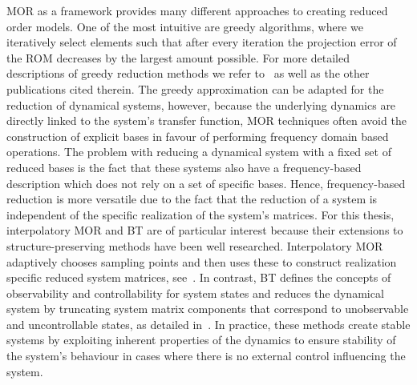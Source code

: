 \ac{MOR} as a framework provides many different approaches to creating reduced order models.
One of the most intuitive are greedy algorithms, where we iteratively select elements such that after every iteration the projection error of the \ac{ROM} decreases by the largest amount possible.
For more detailed descriptions of greedy reduction methods we refer to~\cite{Grepl2005, Rozza2008, Buffa2012} as well as the other publications cited therein.
The greedy approximation can be adapted for the reduction of dynamical systems, however, because the underlying dynamics are directly linked to the system's transfer function, \ac{MOR} techniques often avoid the construction of explicit bases in favour of performing frequency domain based operations.
The problem with reducing a dynamical system with a fixed set of reduced bases is the fact that these systems also have a frequency-based description which does not rely on a set of specific bases.
Hence, frequency-based reduction is more versatile due to the fact that the reduction of a system is independent of the specific realization of the system's matrices.
For this thesis, interpolatory \ac{MOR} and \ac{BT} are of particular interest because their extensions to structure-preserving methods have been well researched.
Interpolatory \ac{MOR} adaptively chooses sampling points and then uses these to construct realization specific reduced system matrices, see~\cite{Antoulas2005, Gugercin2009, Beattie2017}.
In contrast, \ac{BT} defines the concepts of observability and controllability for system states and reduces the dynamical system by truncating system matrix components that correspond to unobservable and uncontrollable states, as detailed in~\cite{Moore1981, Enns1984, Antoulas2005, Gugercin2007, BB2017}.
In practice, these methods create stable systems by exploiting inherent properties of the dynamics to ensure stability of the system's behaviour in cases where there is no external control influencing the system.

